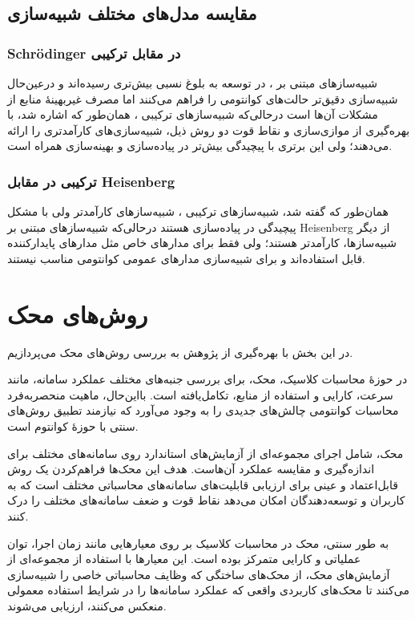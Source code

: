 \subsection{مقایسه مدل‌های مختلف شبیه‌سازی}
\subsubsection{Schrödinger در مقابل ترکیبی }
شبیه‌سازهای مبتنی بر ، در توسعه به بلوغ نسبی بیش‌تری رسیده‌اند و درعین‌حال شبیه‌سازی دقیق‌تر حالت‌های کوانتومی را فراهم می‌کنند اما مصرف غیربهینهٔ منابع از مشکلات آن‌ها است درحالی‌که شبیه‌سازهای ترکیبی ، همان‌طور که اشاره شد، با بهره‌گیری از موازی‌سازی و نقاط قوت دو روش ذیل، شبیه‌سازی‌های کارآمدتری را ارائه می‌دهند؛ ولی این برتری با پیچیدگی بیش‌تر در پیاده‌سازی و بهینه‌سازی همراه است.

\subsubsection{ترکیبی  در مقابل Heisenberg}
همان‌طور که گفته شد، شبیه‌سازهای ترکیبی ، شبیه‌سازهای کارآمدتر ولی با مشکل پیچیدگی در پیاده‌سازی هستند درحالی‌که شبیه‌سازهای مبتنی بر Heisenberg از دیگر شبیه‌سازها، کارآمدتر هستند؛ ولی فقط برای مدارهای خاص مثل مدارهای پایدارکننده قابل استفاده‌اند و برای شبیه‌سازی مدارهای عمومی کوانتومی مناسب نیستند.

\section{روش‌های محک}
در این بخش با بهره‌گیری از پژوهش \cite{acuaviva_benchmarking_2024} به بررسی روش‌های محک می‌پردازیم.

در حوزهٔ محاسبات کلاسیک، محک، برای بررسی جنبه‌های مختلف عملکرد سامانه، مانند سرعت، کارایی و استفاده از منابع، تکامل‌یافته است. بااین‌حال، ماهیت منحصربه‌فرد محاسبات کوانتومی چالش‌های جدیدی را به وجود می‌آورد که نیازمند تطبیق روش‌های سنتی با حوزهٔ کوانتوم است.

محک، شامل اجرای مجموعه‌ای از آزمایش‌های استاندارد روی سامانه‌های مختلف برای اندازه‌گیری و مقایسه عملکرد آن‌هاست. هدف این محک‌ها فراهم‌کردن یک روش قابل‌اعتماد و عینی برای ارزیابی قابلیت‌های سامانه‌های محاسباتی مختلف است که به کاربران و توسعه‌دهندگان امکان می‌دهد نقاط قوت و ضعف سامانه‌های مختلف را درک کنند.

به طور سنتی، محک در محاسبات کلاسیک بر روی معیارهایی مانند زمان اجرا، توان عملیاتی و کارایی متمرکز بوده است. این معیارها با استفاده از مجموعه‌ای از آزمایش‌های محک، از محک‌های ساختگی که وظایف محاسباتی خاصی را شبیه‌سازی می‌کنند تا محک‌های کاربردی واقعی که عملکرد سامانه‌ها را در شرایط استفاده معمولی منعکس می‌کنند، ارزیابی می‌شوند.

